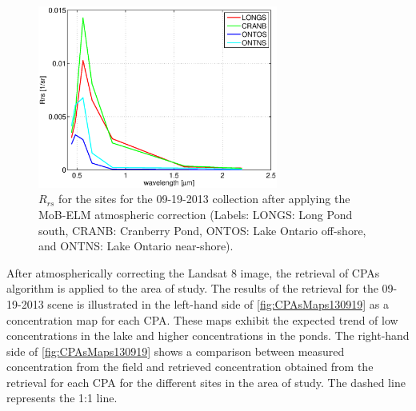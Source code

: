 \documentclass[onecolumn,3p,letterpaper]{elsarticle}
\begin{document}
\begin{figure}[htbp!]
  \centering
  \includegraphics[height=6cm]{./Images/ROI130919_150422}
  \caption{$R_{rs}$ for the sites for the 09-19-2013 collection after applying the MoB-ELM atmospheric correction (Labels: LONGS: Long Pond south, CRANB: Cranberry Pond, ONTOS: Lake Ontario off-shore, and ONTNS: Lake Ontario near-shore).\label{fig:RrsROIs130919} } 
\end{figure}

After atmospherically correcting the Landsat 8 image, the retrieval of CPAs algorithm is applied to the area of study. The results of the retrieval for the 09-19-2013 scene is illustrated in the left-hand side of \autoref{fig:CPAsMaps130919} as a concentration map for each CPA. These maps exhibit the expected trend of low concentrations in the lake and higher concentrations in the ponds. The right-hand side of \autoref{fig:CPAsMaps130919} shows a comparison between measured concentration from the field and retrieved concentration obtained from the retrieval for each CPA for the different sites in the area of study. The dashed line represents the 1:1 line. 
\end{document}
